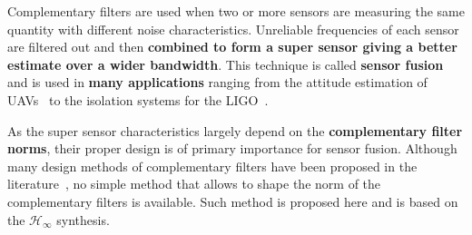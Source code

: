 
Complementary filters are used when two or more sensors are measuring the same quantity with different noise characteristics.
Unreliable frequencies of each sensor are filtered out and then \textbf{combined to form a super sensor giving a better estimate over a wider bandwidth}.
This technique is called \textbf{sensor fusion} and is used in \textbf{many applications} ranging from the attitude estimation of UAVs~\cite{zimmermann92_high_bandw_orien_measur_contr} to the isolation systems for the LIGO~\cite{matichard15_seism_isolat_advan_ligo}.

As the super sensor characteristics largely depend on the \textbf{complementary filter norms}, their proper design is of primary importance for sensor fusion.
Although many design methods of complementary filters have been proposed in the
literature~\cite{jensen13_basic_uas,hua04_polyp_fir_compl_filter_contr_system},
no simple method that allows to shape the norm of the complementary filters is
available. Such method is proposed here and is based on the $\mathcal{H}_\infty$ synthesis.